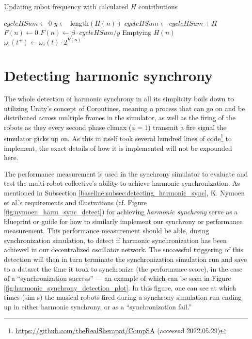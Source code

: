	\begin{algorithm}
	\caption{Updating robot frequency with calculated $H$ contributions}\label{RFAAdjustFrequency}
	\begin{algorithmic}[1]
		\State $cycleHSum \gets 0$ 
		\State $y \gets$ length$(H(n))$
			\State $cycleHSum \gets cycleHSum + H$
		\EndFor
		\State $F(n) \gets 0$
			\State $F(n) \gets \beta \cdot cycleHSum / y$ 
		\EndIf
		\State Emptying $H(n)$ 
		\State $\omega_i(t^+) \gets \omega_i(t) \cdot 2^{F(n)}$
	\EndProcedure
	\end{algorithmic}
	\end{algorithm}
	
	

\section{Detecting harmonic synchrony}
\label{sec:detecting_harmonic_synchrony}

	The whole detection of harmonic synchrony in all its simplicity boils down to utilizing Unity's concept of Coroutines, meaning a process that can go on and be distributed across multiple frames in the simulator, as well as the firing of the robots as they every second phase climax ($\phi=1$) transmit a fire signal the simulator picks up on. As this in itself took several hundred lines of code\footnote{\url{https://github.com/theRealSherapat/CompSA} (accessed 2022.05.29)} to implement, the exact details of how it is implemented will not be expounded here.

	The performance measurement is used in the synchrony simulator to evaluate and test the multi-robot collective's ability to achieve harmonic synchronization. As mentioned in Subsection \ref{baseline:subsec:detecting_harmonic_sync}, K. Nymoen et al.'s requirements and illustrations (cf. Figure \ref{fig:nymoen_harm_sync_detect}) for achieving \textit{harmonic synchrony} serve as a blueprint or guide for how to similarly implement our synchrony or performance measurement. This performance measurement should be able, during synchronization simulation, to detect if harmonic synchronization has been achieved in our decentralized oscillator network. The successful triggering of this detection will then in turn terminate the synchronization simulation run and save to a dataset the time it took to synchronize (the performance score), in the case of a ``synchronization success'' — an example of which can be seen in Figure \ref{fig:harmonic_synchrony_detection_plot}. In this figure, one can see at which times (sim s) the musical robots fired during a synchrony simulation run ending up in either harmonic synchrony, or as a ``synchronization fail.''

